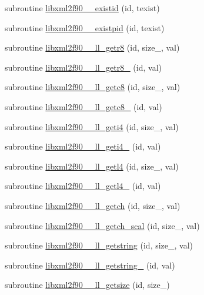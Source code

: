 \begin{DoxyCompactItemize}
subroutine \hyperlink{libxml2f90_8f90__pp_8f90_aa7cbdbfe67d0ec6b1ce87ce016b6cb22}{libxml2f90\+\_\+\+\_\+existid} (id, texist)
\item 
subroutine \hyperlink{libxml2f90_8f90__pp_8f90_a6269f2e5870605109c32aadf4a17808c}{libxml2f90\+\_\+\+\_\+existpid} (id, texist)
\item 
subroutine \hyperlink{libxml2f90_8f90__pp_8f90_a8f48610de931b9ef342dadfd11a62da0}{libxml2f90\+\_\+\+\_\+ll\+\_\+getr8} (id, size\+\_\+, val)
\item 
subroutine \hyperlink{libxml2f90_8f90__pp_8f90_a77f33adc7fb009d5c2f4b8e5201c8f44}{libxml2f90\+\_\+\+\_\+ll\+\_\+getr8\+\_\+} (id, val)
\item 
subroutine \hyperlink{libxml2f90_8f90__pp_8f90_a5d4a74ac67abc4657d96bcc55fad78f3}{libxml2f90\+\_\+\+\_\+ll\+\_\+getc8} (id, size\+\_\+, val)
\item 
subroutine \hyperlink{libxml2f90_8f90__pp_8f90_a3cf0a08fd399cfb2380738008cc1523e}{libxml2f90\+\_\+\+\_\+ll\+\_\+getc8\+\_\+} (id, val)
\item 
subroutine \hyperlink{libxml2f90_8f90__pp_8f90_a90fdd12e3f7794c98317d1b08550f01f}{libxml2f90\+\_\+\+\_\+ll\+\_\+geti4} (id, size\+\_\+, val)
\item 
subroutine \hyperlink{libxml2f90_8f90__pp_8f90_a1c2a48ca65f77d8c56223d71e08ced37}{libxml2f90\+\_\+\+\_\+ll\+\_\+geti4\+\_\+} (id, val)
\item 
subroutine \hyperlink{libxml2f90_8f90__pp_8f90_a1b0c5cd537f12f2edf530cddaf84caf5}{libxml2f90\+\_\+\+\_\+ll\+\_\+getl4} (id, size\+\_\+, val)
\item 
subroutine \hyperlink{libxml2f90_8f90__pp_8f90_afb97bd01984f5df9ea5c58e09e719501}{libxml2f90\+\_\+\+\_\+ll\+\_\+getl4\+\_\+} (id, val)
\item 
subroutine \hyperlink{libxml2f90_8f90__pp_8f90_a6197ea91babb017cbc3cec50fe124c03}{libxml2f90\+\_\+\+\_\+ll\+\_\+getch} (id, size\+\_\+, val)
\item 
subroutine \hyperlink{libxml2f90_8f90__pp_8f90_ad30886dc2d259aec8eb502721e5347fc}{libxml2f90\+\_\+\+\_\+ll\+\_\+getch\+\_\+scal} (id, size\+\_\+, val)
\item 
subroutine \hyperlink{libxml2f90_8f90__pp_8f90_ab60330c194bfbef4790a34db8f896d24}{libxml2f90\+\_\+\+\_\+ll\+\_\+getstring} (id, size\+\_\+, val)
\item 
subroutine \hyperlink{libxml2f90_8f90__pp_8f90_a5a0b5cda999773856f04bc2047a3a95e}{libxml2f90\+\_\+\+\_\+ll\+\_\+getstring\+\_\+} (id, val)
\item 
subroutine \hyperlink{libxml2f90_8f90__pp_8f90_a6ae6ccc230fcca3282294c098febee5a}{libxml2f90\+\_\+\+\_\+ll\+\_\+getsize} (id, size\+\_\+)

\end{DoxyCompactItemize}
